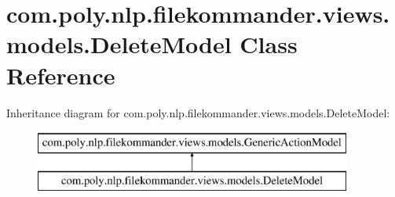 \hypertarget{classcom_1_1poly_1_1nlp_1_1filekommander_1_1views_1_1models_1_1_delete_model}{\section{com.\-poly.\-nlp.\-filekommander.\-views.\-models.\-Delete\-Model Class Reference}
\label{classcom_1_1poly_1_1nlp_1_1filekommander_1_1views_1_1models_1_1_delete_model}
}
Inheritance diagram for com.\-poly.\-nlp.\-filekommander.\-views.\-models.\-Delete\-Model\-:\begin{figure}[H]
\begin{center}
\leavevmode
\includegraphics[height=2.000000cm]{classcom_1_1poly_1_1nlp_1_1filekommander_1_1views_1_1models_1_1_delete_model}
\end{center}
\end{figure}

